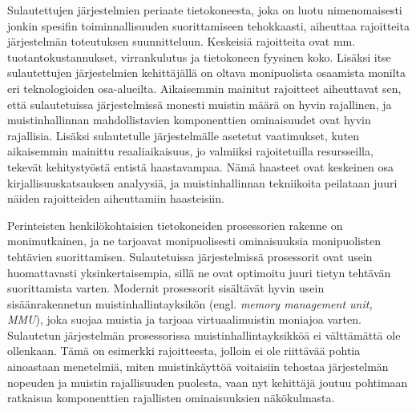 Sulautettujen järjestelmien periaate tietokoneesta, joka on luotu nimenomaisesti jonkin spesifin toiminnallisuuden suorittamiseen tehokkaasti, aiheuttaa rajoitteita järjestelmän toteutuksen suunnitteluun. Keskeisiä rajoitteita ovat mm. tuotantokustannukset, virrankulutus ja tietokoneen fyysinen koko. Lisäksi itse sulautettujen järjestelmien kehittäjällä on oltava monipuolista osaamista monilta eri teknologioiden osa-alueilta.\cite{rtcfes2015book} Aikaisemmin mainitut rajoitteet aiheuttavat sen, että sulautetuissa järjestelmissä monesti muistin määrä on hyvin rajallinen, ja muistinhallinnan mahdollistavien komponenttien ominaisuudet ovat hyvin rajallisia. Lisäksi sulautetulle järjestelmälle asetetut vaatimukset, kuten aikaisemmin mainittu reaaliaikaisuus, jo valmiiksi rajoitetuilla resursseilla, tekevät kehitystyöstä entistä haastavampaa. Nämä haasteet ovat keskeinen osa kirjallisuuskatsauksen analyysiä, ja muistinhallinnan tekniikoita peilataan juuri näiden rajoitteiden aiheuttamiin haasteisiin.

Perinteisten henkilökohtaisien tietokoneiden prosessorien rakenne on monimutkainen, ja ne tarjoavat monipuolisesti ominaisuuksia monipuolisten tehtävien suorittamisen. Sulautetuissa järjestelmissä prosessorit ovat usein huomattavasti yksinkertaisempia, sillä ne ovat optimoitu juuri tietyn tehtävän suorittamista varten. Modernit prosessorit sisältävät hyvin usein sisäänrakennetun muistinhallintayksikön (engl. \textit{memory management unit, MMU}), joka suojaa muistia ja tarjoaa virtuaalimuistin moniajoa varten. Sulautetun järjestelmän prosessorissa muistinhallintayksikköä ei välttämättä ole ollenkaan.\cite{rtcfes2015book} Tämä on esimerkki rajoitteesta, jolloin ei ole riittävää pohtia ainoastaan menetelmiä, miten muistinkäyttöä voitaisiin tehostaa järjestelmän nopeuden ja muistin rajallisuuden puolesta, vaan nyt kehittäjä joutuu pohtimaan ratkaisua komponenttien rajallisten ominaisuuksien näkökulmasta.